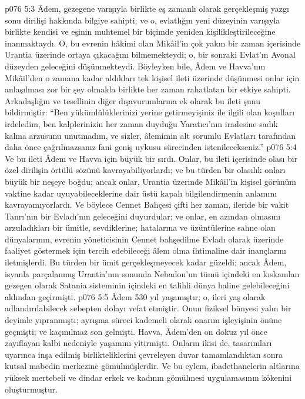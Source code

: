 \vs p076 5:3 Âdem, gezegene varışıyla birlikte eş zamanlı olarak gerçekleşmiş yazgı sonu dirilişi hakkında bilgiye sahipti; ve o, evlatlığın yeni düzeyinin varışıyla birlikte kendisi ve eşinin muhtemel bir biçimde yeniden kişilikleştirileceğine inanmaktaydı. O, bu evrenin hâkimi olan Mikâil’in çok yakın bir zaman içerisinde Urantia üzerinde ortaya çıkacağını bilmemekteydi; o, bir sonraki Evlat’ın Avonal düzeyden geleceğini düşünmekteydi. Böyleyken bile, Âdem ve Havva’nın Mikâil’den o zamana kadar aldıkları tek kişisel ileti üzerinde düşünmesi onlar için anlaşılması zor bir şey olmakla birlikte her zaman rahatlatan bir etkiye sahipti. Arkadaşlığın ve tesellinin diğer dışavurumlarına ek olarak bu ileti şunu bildirmiştir: “Ben yükümlülüklerinizi yerine getirmeyişiniz ile ilgili olan koşulları irdeledim, ben kalplerinizin her zaman duyduğu Yaratıcı’nın iradesine sadık kalma arzusunu unutmadım, ve sizler, âlemimin alt sorumlu Evlatları tarafından daha önce çağrılmazsanız fani geniş uykusu sürecinden istenilecekseniz.”
\vs p076 5:4 Ve bu ileti Âdem ve Havva için büyük bir sırdı. Onlar, bu ileti içerisinde olası bir özel dirilişin örtülü sözünü kavrayabiliyorlardı; ve bu türden bir olasılık onları büyük bir neşeye boğdu; ancak onlar, Urantia üzerinde Mikâil’in kişisel görünüm vaktine kadar uyuyabileceklerine dair üstü kapalı bilgilendirmenin anlamını kavrayamıyorlardı. Ve böylece Cennet Bahçesi çifti her zaman, ileride bir vakit Tanrı’nın bir Evladı’nın geleceğini duyurdular; ve onlar, en azından olmasını arzuladıkları bir ümitle, sevdiklerine; hatalarına ve üzüntülerine sahne olan dünyalarının, evrenin yöneticisinin Cennet bahşedilme Evladı olarak üzerinde faaliyet göstermek için tercih edebileceği âlem olma ihtimaline dair inançlarını iletmişlerdi. Bu türden bir ümit gerçekleşmeyecek kadar güzeldi; ancak Âdem, isyanla parçalanmış Urantia’nın sonunda Nebadon’un tümü içindeki en kıskanılan gezegen olarak Satania sisteminin içindeki en talihli dünya haline gelebileceğini aklından geçirmişti.
\vs p076 5:5 Âdem 530 yıl yaşamıştır; o, ileri yaş olarak adlandırılabilecek sebepten dolayı vefat etmiştir. Onun fiziksel bünyesi yalın bir deyimle yıpranmıştı; ayrışma süreci kademeli olarak onarım işleyişinin önüne geçmişti; ve kaçınılmaz son gelmişti. Havva, Âdem’den on dokuz yıl önce zayıflayan kalbi nedeniyle yaşamını yitirmişti. Onların ikisi de, tasarımları uyarınca inşa edilmiş birlikteliklerini çevreleyen duvar tamamlandıktan sonra kutsal mabedin merkezine gömülmüşlerdir. Ve bu eylem, ibadethanelerin altlarına yüksek mertebeli ve dindar erkek ve kadının gömülmesi uygulamasının kökenini oluşturmuştur.
